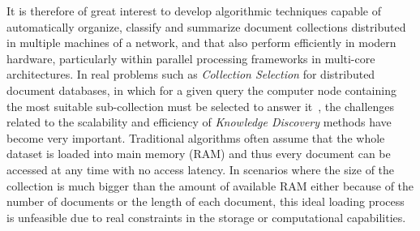 \documentclass[10pt]{article}
\begin{document}
It is therefore of great interest to develop algorithmic techniques capable of automatically organize, classify and summarize document collections distributed in multiple machines of a network, and that also perform efficiently in modern hardware, particularly within parallel processing frameworks in multi-core architectures. In real problems such as \textit{Collection Selection} for distributed document databases, in which for a given query the computer node containing the most suitable
sub-collection must be selected to answer it~\citep{CM13}, the challenges related to the scalability and efficiency of \textit{Knowledge Discovery} methods have become very important. Traditional algorithms often assume that the whole dataset is loaded into main memory (RAM) and thus every document can be accessed at any time with no access latency. In scenarios where the size of the collection is much bigger than the amount of available RAM either because of the number of documents or the length of each document, this ideal loading process is unfeasible due to real constraints in the storage or computational capabilities.
\end{document}
